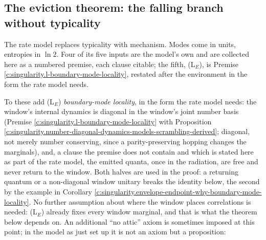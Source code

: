 \documentclass[11pt]{article}
\theoremstyle{definition}
\theoremstyle{plain}
\begin{document}
\subsection*{The eviction theorem: the falling branch without typicality}
\label{c:note.singularity.setting-eviction-theorem-falling-branch-without}
The rate model replaces typicality with mechanism. Modes come in units, entropies in $\ln 2$. Four of its five inputs are the model's own and are collected here as a numbered premise, each clause citable; the fifth, (L$_E$), is Premise \ref{c:singularity.l-boundary-mode-locality}, restated after the environment in the form the rate model needs.

\label{c:note.singularity.setting-eviction-theorem-falling-branch-without-2}
To these add (L$_E$) \emph{boundary-mode locality}, in the form the rate model needs: the window's internal dynamics is diagonal in the window's joint number basis (Premise \ref{c:singularity.l-boundary-mode-locality} with Proposition \ref{c:singularity.number-diagonal-dynamics-models-scrambling-derived}; diagonal, not merely number conserving, since a parity-preserving hopping changes the marginals), and, a clause the premise does not contain and which is stated here as part of the rate model, the emitted quanta, once in the radiation, are free and never return to the window. Both halves are used in the proof: a returning quantum or a non-diagonal window unitary breaks the identity below, the second by the example in Corollary \ref{c:singularity.envelope-endpoint-why-boundary-mode-locality}. No further assumption about where the window places correlations is needed: (L$_E$) already fixes every window marginal, and that is what the theorem below depends on. An additional ``no attic'' axiom is sometimes imposed at this point; in the model as just set up it is not an axiom but a proposition:
\end{document}

